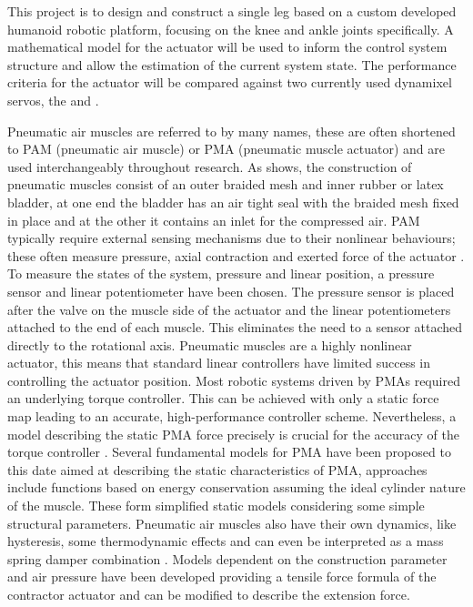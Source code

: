 \documentclass[11pt,a4paper]{article}
\begin{document}
This project is to design and construct a single leg based on a custom developed humanoid robotic platform, focusing on the knee and ankle joints specifically. A mathematical model for the actuator will be used to inform the control system structure and allow the estimation of the current system state. The performance criteria for the actuator will be compared against two currently used dynamixel servos, the \cite{robotis_mx106} and \cite{robotis}.\newline

Pneumatic air muscles are referred to by many names, these are often shortened to PAM (pneumatic air muscle) or PMA (pneumatic muscle actuator) and are used interchangeably throughout research. As  shows, the construction of pneumatic muscles consist of an outer braided mesh and inner rubber or latex bladder, at one end the bladder has an air tight seal with the braided mesh fixed in place and at the other it contains an inlet for the compressed air. PAM typically require external sensing mechanisms due to their nonlinear behaviours; these often measure pressure, axial contraction and exerted force of the actuator \cite{erin_pol_valle_park_2016}. To measure the states of the system, pressure and linear position, a pressure sensor and linear potentiometer have been chosen. The pressure sensor is placed after the valve on the muscle side of the actuator and the linear potentiometers attached to the end of each muscle. This eliminates the need to a sensor attached directly to the rotational axis. Pneumatic muscles are a highly nonlinear actuator, this means that standard linear controllers have limited success in controlling the actuator position. Most robotic systems driven by PMAs required an underlying torque controller. This can be achieved with only a static force map leading to an accurate, high-performance controller scheme. Nevertheless, a model describing the static PMA force precisely is crucial for the accuracy of the torque controller \cite{martens_boblan_2017}. Several fundamental models for PMA have been proposed to this date aimed at describing the static characteristics of PMA, approaches include functions based on energy conservation assuming the ideal cylinder nature of the muscle. These form simplified static models considering some simple structural parameters. Pneumatic air muscles also have their own dynamics, like hysteresis, some thermodynamic effects and can even be interpreted as a mass spring damper combination \cite{martens_boblan_2017}. Models dependent on the construction parameter and air pressure have been developed providing a tensile force formula of the contractor actuator and can be modified to describe the extension force.\newline
\end{document}
